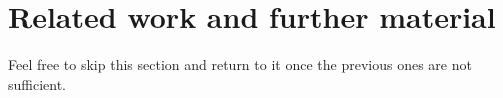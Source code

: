 \section{Related work and further material}

\begin{guidance}
 Feel free to skip this section and return to it once the previous ones are not
 sufficient.
\end{guidance}


% 
% 
% 
% 

